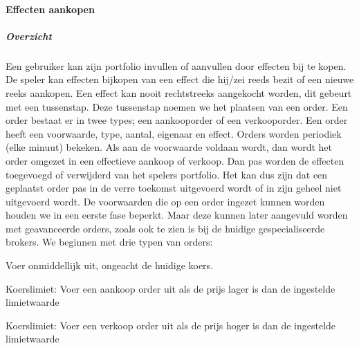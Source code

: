 \paragraph{Effecten aankopen}
\begin{compact}

\subparagraph{Overzicht}Een gebruiker kan zijn portfolio invullen of aanvullen door effecten bij te kopen. De speler kan effecten bijkopen van een effect die hij/zei reeds bezit of een nieuwe reeks aankopen. Een effect kan nooit rechtstreeks aangekocht worden, dit gebeurt met een tussenstap. Deze tussenstap noemen we het plaatsen van een order. Een order bestaat er in twee types; een aankooporder of een verkooporder. Een order heeft een voorwaarde, type, aantal, eigenaar en effect. Orders worden periodiek (elke minuut) bekeken. Als aan de voorwaarde voldaan wordt, dan wordt het order omgezet in een effectieve aankoop of verkoop. Dan pas worden de effecten toegevoegd of verwijderd van het spelers portfolio. Het kan dus zijn dat een geplaatst order pas in de verre toekomst uitgevoerd wordt of in zijn geheel niet uitgevoerd wordt. De voorwaarden die op een order ingezet kunnen worden houden we in een eerste fase beperkt. Maar deze kunnen later aangevuld worden met geavanceerde orders, zoals ook te zien is bij de huidige gespecialiseerde brokers. We beginnen met drie typen van orders:

\begin{itemize_compact}
 \item Voer onmiddellijk uit, ongeacht de huidige koers.
 \item Koerslimiet: Voer een aankoop order uit als de prijs lager is dan de ingestelde limietwaarde
 \item Koerslimiet: Voer een verkoop order uit als de prijs hoger is dan de ingestelde limietwaarde
\end{itemize_compact}


\end{compact}
